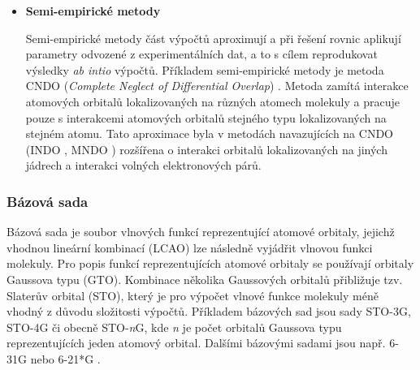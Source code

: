 \begin{itemize}
    \item \textbf{Semi-empirické metody}
    
    Semi-empirické metody část výpočtů aproximují a při řešení rovnic aplikují parametry odvozené z experimentálních dat, a to s cílem reprodukovat výsledky \textit{ab intio} výpočtů. Příkladem semi-empirické metody je metoda CNDO (\textit{Complete Neglect of Differential Overlap}) \cite{CNDO}. Metoda zamítá interakce atomových orbitalů lokalizovaných na různých atomech molekuly a pracuje pouze s interakcemi atomových orbitalů stejného typu lokalizovaných na stejném atomu. Tato aproximace byla v metodách navazujících na CNDO (INDO \cite{INDO}, MNDO \cite{MNDO}) rozšířena o interakci orbitalů lokalizovaných na jiných jádrech a interakci volných elektronových párů.
\end{itemize}


\subsubsection{Bázová sada}
Bázová sada je soubor vlnových funkcí reprezentující atomové orbitaly, jejichž vhodnou lineární kombinací (LCAO) lze následně vyjádřit vlnovou funkci molekuly. %
Pro popis funkcí reprezentujících atomové orbitaly se používají orbitaly Gaussova typu (GTO). Kombinace několika Gaussových orbitalů přibližuje tzv. Slaterův orbital (STO), který je pro výpočet vlnové funkce molekuly méně vhodný z důvodu složitosti výpočtů. Příkladem bázových sad jsou sady STO-3G, STO-4G či obecně STO-\textit{n}G, kde \textit{n} je počet orbitalů Gaussova typu reprezentujících jeden atomový orbital. Dalšími bázovými sadami jsou např. 6-31G nebo 6-21*G \cite{basis_set}.

